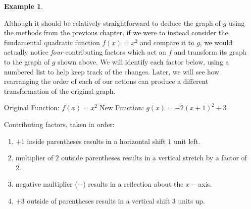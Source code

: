 \documentclass[11pt]{book}
\theoremstyle{definition}  %
\newtheorem{example}{Example}[chapter]
\begin{document}
\begin{example}
\begin{multicols}{2}
\end{multicols}
Although it should be relatively straightforward to deduce the graph of $g$ using the methods from the previous chapter, if we were to instead consider the fundamental quadratic function $f(x)=x^2$ and compare it to $g$, we would actually notice \textit{four} contributing factors which act on $f$ and transform its graph to the graph of $g$ shown above.  We will identify each factor below, using a numbered list to help keep track of the changes.  Later, we will see how rearranging the order of each of our actions can produce a different transformation of the original graph. 
\begin{center}
Original Function: $f(x)=x^2$ \hspace{0.25in} New Function: $g(x)=-2(x+1)^2+3$
\end{center}

Contributing factors, taken in order:
\begin{enumerate}
	\item $+1$ inside parentheses results in a horizontal shift $1$ unit left.
	\item multiplier of $2$ outside parentheses results in a vertical stretch by a factor of 2.
	\item negative multiplier ($-$) results in a reflection about the $x-$axis.
	\item $+3$ outside of parentheses results in a vertical shift $3$ units up.
\end{enumerate}
\end{example}
\end{document}
